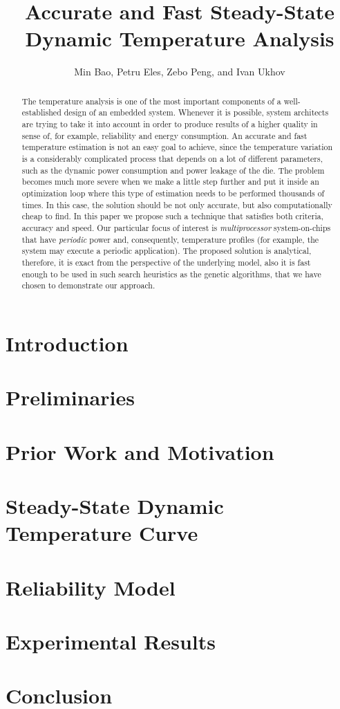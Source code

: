\documentclass[conference]{IEEEtran}
\title{Accurate and Fast Steady-State\\Dynamic Temperature Analysis}
\author{Min Bao, Petru Eles, Zebo Peng, and Ivan Ukhov}
\newcommand{\ssdtc}{Steady-State Dynamic Temperature Curve}
\begin{document}
  \maketitle

  \begin{abstract}
    The temperature analysis is one of the most important components of a well-established design of an embedded system. Whenever it is possible, system architects are trying to take it into account in order to produce results of a higher quality in sense of, for example, reliability and energy consumption. An accurate and fast temperature estimation is not an easy goal to achieve, since the temperature variation is a considerably complicated process that depends on a lot of different parameters, such as the dynamic power consumption and power leakage of the die. The problem becomes much more severe when we make a little step further and put it inside an optimization loop where this type of estimation needs to be performed thousands of times. In this case, the solution should be not only accurate, but also computationally cheap to find. In this paper we propose such a technique that satisfies both criteria, accuracy and speed. Our particular focus of interest is \emph{multiprocessor} system-on-chips that have \emph{periodic} power and, consequently, temperature profiles (for example, the system may execute a periodic application). The proposed solution is analytical, therefore, it is exact from the perspective of the underlying model, also it is fast enough to be used in such search heuristics as the genetic algorithms, that we have chosen to demonstrate our approach.

  \end{abstract}

  \section{Introduction}
  

  \section{Preliminaries}
  

  \section{Prior Work and Motivation}
  

  \section{\ssdtc}
  

  \section{Reliability Model}
  

  \section{Experimental Results} \label{sec:results}
  

  \section{Conclusion}
  

  
\end{document}
